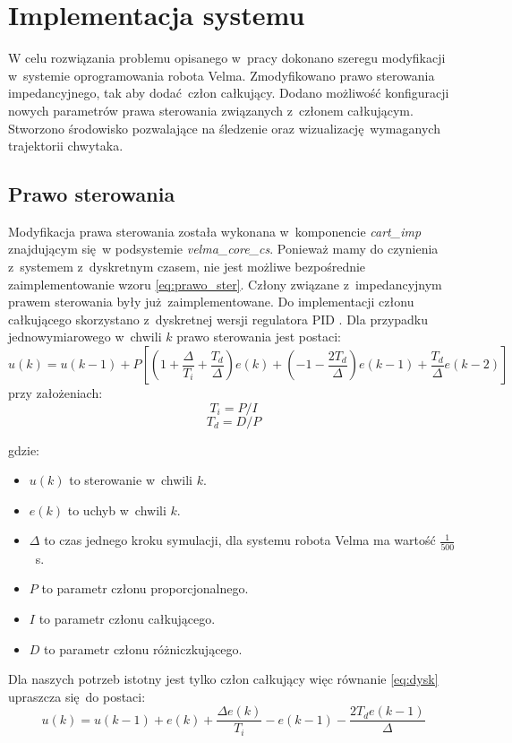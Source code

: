
\chapter{Implementacja systemu \label{chap:specyfikacja_systemu}}
W celu rozwiązania problemu opisanego w~pracy dokonano szeregu modyfikacji w~systemie oprogramowania robota Velma. Zmodyfikowano prawo sterowania impedancyjnego, tak aby dodać człon całkujący. Dodano możliwość konfiguracji nowych parametrów prawa sterowania związanych z~członem całkującym. Stworzono środowisko pozwalające na śledzenie oraz wizualizację wymaganych trajektorii chwytaka.

\section{Prawo sterowania}
Modyfikacja prawa sterowania została wykonana w~komponencie \textit{cart\_imp} znajdującym się w podsystemie \textit{velma\_core\_cs}. Ponieważ mamy do czynienia z~systemem z~dyskretnym czasem, nie jest możliwe bezpośrednie zaimplementowanie wzoru \ref{eq:prawo_ster}. Człony związane z~impedancyjnym prawem sterowania były już zaimplementowane. Do implementacji członu całkującego skorzystano z~dyskretnej wersji regulatora PID \cite{wiki:PID_controller}. Dla przypadku jednowymiarowego w~chwili $k$ prawo sterowania jest postaci:
\begin{equation}
\label{eq:dysk}
u(k) = u(k-1) + P[(1 + \frac{\Delta}{T_i} + \frac{T_d}{\Delta})e(k) + (-1-\frac{2T_d}{\Delta})e(k-1) + \frac{T_d}{\Delta}e(k-2)]
\end{equation}
przy założeniach:
\begin{equation}
T_i = P/I
\end{equation}
\begin{equation}
T_d = D/P
\end{equation}

gdzie:
\begin{itemize}
	\item $u(k)$ to sterowanie w~chwili $k$.
	\item $e(k)$ to uchyb w~chwili $k$.
	\item $\Delta$ to czas jednego kroku symulacji, dla systemu robota Velma ma wartość $\frac{1}{500}$~s.
	\item $P$ to parametr członu proporcjonalnego.
	\item $I$ to parametr członu całkującego.
	\item $D$ to parametr członu różniczkującego.
\end{itemize}
Dla naszych potrzeb istotny jest tylko człon całkujący więc równanie \ref{eq:dysk} upraszcza się do postaci:
\begin{equation}
\label{eq:dysk_cal}
	u(k) = u(k-1) + e(k)+\frac{\Delta e(k)}{T_i} - e(k-1) -\frac{2T_de(k-1)}{\Delta} 
\end{equation}


